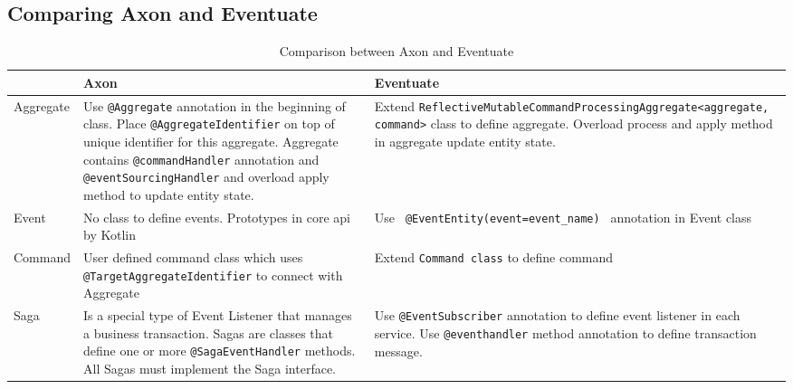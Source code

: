 \subsection{Comparing Axon and Eventuate}

\begin{table}[H]
\begin{center}
  \begin{tabular}{ | m{2cm} | L | L | }
    \hline
    & Axon & Eventuate \\

    \hline
    Aggregate &
    Use \texttt{@Aggregate} annotation in the beginning of class. Place  \texttt{@Aggregate\-Identifier} on top of unique identifier for this aggregate. Aggregate contains \texttt{@commandHandler} annotation and \texttt{@eventSourcingHandler} and overload apply method to update entity state.  &
    Extend  \texttt{ReflectiveMutableCommand\-ProcessingAggregate<aggregate, command>} class to define aggregate. Overload process and apply method in aggregate update entity state. \\

    \hline
    Event &
    No class to define events. Prototypes in core api by Kotlin &
    Use \texttt{ @EventEntity(event=event\_n\-ame) } annotation in Event class \\

    \hline
    Command &
    User defined command class which uses \texttt{@TargetAggregate\-Identifier} to connect with Aggregate &
    Extend  \texttt{Command class} to define command \\

    \hline
    Saga &
    Is a special type of Event Listener that manages a business transaction. Sagas are classes that define one or more \texttt{@SagaEventHandler} methods. All Sagas must implement the Saga interface. &
    Use \texttt{@EventSubscriber} annotation to define event listener in each service. Use \texttt{@eventhandler} method annotation to define transaction message. \\
    \hline

  \end{tabular}
\end{center}
\caption{Comparison between Axon and Eventuate}
\label{table:compare}
\end{table}

